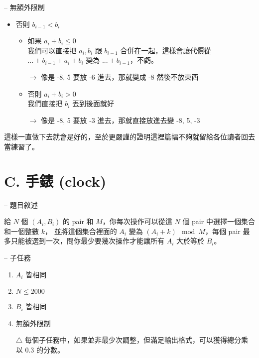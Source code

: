 \documentclass[hyperref,UTF8,notheorems,xcolor={dvipsnames}]{beamer}
\newcommand{\btitle}[1]{{\secname} -- #1}
\theoremstyle{definition}
\begin{document}
\begin{frame}[fragile]{\btitle{無額外限制}}
	\begin{itemize}
		\item 否則 $b_{i - 1} < b_i$ 
			\pause
			\begin{itemize}
				\item 如果 $a_{i} + b_{i} \le 0$ \\
				我們可以直接把 $a_i, b_i$ 跟 $b_{i - 1}$ 合併在一起，這樣會讓代價從 $... + b_{i - 1} + a_{i} + b_{i}$ 變為 $... + b_{i - 1}$，不虧。
				\pause
				\item[$\rightarrow$] 像是 -8, 5 要放 -6 進去，那就變成 -8 然後不放東西
				\pause
				\item 否則 $a_{i} + b_{i} > 0$ \\
				我們直接把 $b_i$ 丟到後面就好
				\pause

				\item[$\rightarrow$] 像是 -8, 5 要放 -3 進去，那就直接放進去變 -8, 5, -3

			\end{itemize}

	\end{itemize}
	\pause

	這樣一直做下去就會是好的，至於更嚴謹的證明這裡篇幅不夠就留給各位讀者回去當練習了。
	
\end{frame}

\section{C.  手錶 (clock)}

\begin{frame}[fragile]{\btitle{題目敘述}}

	給 $N$ 個 $(A_i, B_i)$ 的 pair 和 $M$，你每次操作可以從這 $N$ 個 pair 中選擇一個集合和一個整數 $k$，
	並將這個集合裡面的 $A_i$ 變為 $(A_i + k) \mod M$，每個 pair 最多只能被選到一次，問你最少要幾次操作才能讓所有 $A_i$ 大於等於 $B_i$。

\end{frame}

\begin{frame}[fragile]{\btitle{子任務}}
	\begin{enumerate}
		\item $A_i$ 皆相同
		\item $N \le 2000$
		\item $B_i$ 皆相同
		\item 無額外限制
		\item[$\triangle$] 每個子任務中，如果並非最少次調整，但滿足輸出格式，可以獲得總分乘以 0.3 的分數。
	\end{enumerate}
\end{frame}
\end{document}

